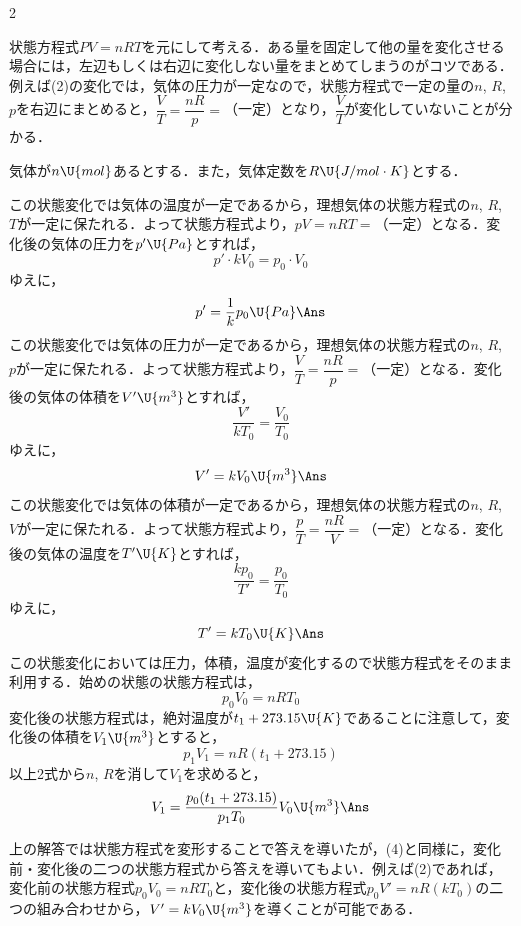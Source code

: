 \begin{multicols}{2}
\par\nopagebreak
\begin{sisin}
状態方程式$PV=nRT$を元にして考える．ある量を固定して他の量を変化させる場合には，左辺もしくは右辺に変化しない量をまとめてしまうのがコツである．例えば(2)の変化では，気体の圧力が一定なので，状態方程式で一定の量の$n$, $R$, $p$を右辺にまとめると，$\dfrac{V}{T}=\dfrac{nR}{p}=$（一定）となり，$\dfrac{V}{T}$が変化していないことが分かる．
\end{sisin}
\par\nopagebreak
\hspace{1zw}気体が$n\U{mol}$あるとする．また，気体定数を$R\U{J/mol\cdot K}$とする．
\begin{komon}
 この状態変化では気体の温度が一定であるから，理想気体の状態方程式の$n$, $R$, $T$が一定に保たれる．よって状態方程式より，$pV=nRT=$（一定）となる．変化後の気体の圧力を$p'\U{Pa}$とすれば，
       \[p'\cdot kV_0=p_0\cdot V_0\]
       ゆえに，
       \[p'=\frac{1}{k}p_0\U{Pa}\Ans\]
 この状態変化では気体の圧力が一定であるから，理想気体の状態方程式の$n$, $R$, $p$が一定に保たれる．よって状態方程式より，$\dfrac{V}{T}=\dfrac{nR}{p}=$（一定）となる．変化後の気体の体積を$V'\U{m^3}$とすれば，
       \[\frac{V'}{kT_0}=\frac{V_0}{T_0}\]
       ゆえに，
       \[V'=kV_0\U{m^3}\Ans\]
 この状態変化では気体の体積が一定であるから，理想気体の状態方程式の$n$, $R$, $V$が一定に保たれる．よって状態方程式より，$\dfrac{p}{T}=\dfrac{nR}{V}=$（一定）となる．変化後の気体の温度を$T'\U{K}$とすれば，
       \[\frac{kp_0}{T'}=\frac{p_0}{T_0}\]
       ゆえに，
       \[T'=kT_0\U{K}\Ans\]
 この状態変化においては圧力，体積，温度が変化するので状態方程式をそのまま利用する．始めの状態の状態方程式は，
       \[p_0V_0=nRT_0\]
       変化後の状態方程式は，絶対温度が$t_1+273.15\U{K}$であることに注意して，変化後の体積を$V_1\U{m^3}$とすると，
       \[p_1V_1=nR(t_1+273.15)\]
       以上2式から$n$, $R$を消して$V_1$を求めると，
       \[V_1=\frac{p_0(t_1+273.15)}{p_1T_0}V_0\U{m^3}\Ans\]
\end{komon}
\begin{chuu}
\hspace{1zw}上の解答では状態方程式を変形することで答えを導いたが，(4)と同様に，変化前・変化後の二つの状態方程式から答えを導いてもよい．例えば(2)であれば，変化前の状態方程式$p_0V_0=nRT_0$と，変化後の状態方程式$p_0V'=nR(kT_0)$の二つの組み合わせから，$V'=kV_0\U{m^3}$を導くことが可能である．
\end{chuu}


\end{multicols}
